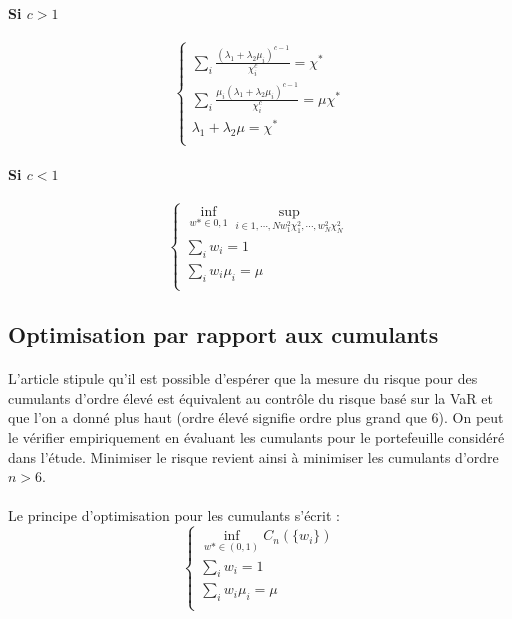 \documentclass{article}
\begin{document}
      \paragraph{Si $c>1$}
     \begin{equation}
      \left\{
      \begin{aligned}
     \sum_{i}\frac{(\lambda _{1}+\lambda_{2}\mu _{i})^{c-1}}{\chi _{i}^{c}}=\chi^{*}\\
      \sum_{i}\frac{\mu _{i}(\lambda _{1}+\lambda_{2}\mu _{i})^{c-1}}{\chi _{i}^{c}}=\mu \chi^{*}\\
      \lambda_{1}+\lambda_{2}\mu =\chi ^{*}\\
      \end{aligned}
    \right.
     \end{equation}
      \paragraph{Si $c<1$}
      \begin{equation}
      \left\{
      \begin{aligned}
    \inf_{w*\in {0,1}}{\sup_{i\in {1,\cdots ,N}{w_{1}^{2}\chi ^{2}_{1},\cdots ,w_{N}^{2}\chi ^{2}_{N}}}}\\
      \sum _{i} w_{i}=1\\
      \sum _{i} w_{i}\mu_{i}=\mu\\
      \end{aligned}
    \right.
      \end{equation}
      \subsection{Optimisation par rapport aux cumulants}
\paragraph{}      
      L'article stipule qu'il est possible d'espérer que la mesure du risque pour des cumulants d'ordre élevé est équivalent au contrôle du risque basé sur la VaR et que l'on a donné plus haut (ordre élevé signifie ordre plus grand que $6$). On peut le vérifier empiriquement en évaluant les cumulants pour le portefeuille considéré dans l'étude. Minimiser le risque revient ainsi à minimiser les cumulants d'ordre $n>6$.
    \paragraph{}
     Le principe d'optimisation pour les cumulants s'écrit :
       \begin{equation}
  \left\{
      \begin{aligned}
     \inf_{w*\in {(0,1)}}C_{n}(\lbrace w_{i}\rbrace )\\
     \sum _{i} w_{i}=1\\
     \sum _{i} w_{i}\mu_{i}=\mu\\
      \end{aligned}
    \right.
\end{equation} 
    
\end{document}

